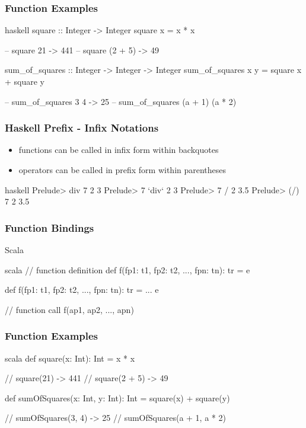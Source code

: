 \documentclass[dvipsnames]{beamer}
\theoremstyle{plain}
\begin{document}
\begin{frame}[fragile]
  \frametitle{Function Examples}

  \begin{example}[Haskell]
    \begin{pygments}{haskell}
square :: Integer -> Integer
square x = x * x

-- square 21 -> 441
-- square (2 + 5) -> 49

sum_of_squares :: Integer -> Integer -> Integer
sum_of_squares x y = square x + square y

-- sum_of_squares 3 4 -> 25
-- sum_of_squares (a + 1) (a * 2)
    \end{pygments}
  \end{example}
\end{frame}

\begin{frame}[fragile]
  \frametitle{Haskell Prefix - Infix Notations}

  \begin{itemize}
    \item functions can be called in infix form within backquotes
    \item operators can be called in prefix form within parentheses
  \end{itemize}

  \begin{example}
    \begin{pygments}{haskell}
Prelude> div 7 2
3
Prelude> 7 `div` 2
3
Prelude> 7 / 2
3.5
Prelude> (/) 7 2
3.5
    \end{pygments}
  \end{example}
\end{frame}

\begin{frame}[fragile]
  \frametitle{Function Bindings}

  \begin{block}{Scala}
    \begin{pygments}{scala}
// function definition
def f(fp1: t1, fp2: t2, ..., fpn: tn): tr = e

def f(fp1: t1, fp2: t2, ..., fpn: tn): tr = {
    ...
    e
}

// function call
f(ap1, ap2, ..., apn)
    \end{pygments}
  \end{block}
\end{frame}

\begin{frame}[fragile]
  \frametitle{Function Examples}

  \begin{example}[Scala]
    \begin{pygments}{scala}
def square(x: Int): Int = x * x

// square(21) -> 441
// square(2 + 5) -> 49

def sumOfSquares(x: Int, y: Int): Int =
    square(x) + square(y)

// sumOfSquares(3, 4) -> 25
// sumOfSquares(a + 1, a * 2)
    \end{pygments}
  \end{example}
\end{frame}
\end{document}
